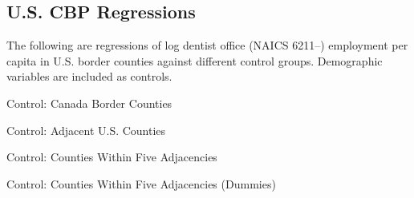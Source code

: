 \subsection{U.S. CBP Regressions}
The following are regressions of log dentist office (NAICS 6211--) employment per capita in U.S. border counties against different control groups.
Demographic variables are included as controls.

\begin{table}[H]
	\caption{Control: Canada Border Counties}
	\centering

\end{table}

\begin{table}[H]
	\caption{Control: Adjacent U.S. Counties}
	\centering

\end{table}

\begin{table}[H]
	\caption{Control: Counties Within Five Adjacencies}
	\centering

\end{table}

\begin{table}[H]
	\caption{Control: Counties Within Five Adjacencies (Dummies)}
	\centering

\end{table}
